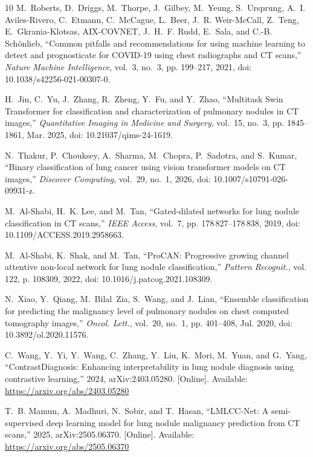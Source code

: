 \documentclass{ieeeaccess}
\begin{document}
\begin{thebibliography}{10}
M.~Roberts, D.~Driggs, M.~Thorpe, J.~Gilbey, M.~Yeung, S.~Ursprung, A.~I. Aviles-Rivero, C.~Etmann, C.~McCague, L.~Beer, J.~R. Weir-McCall, Z.~Teng, E.~Gkrania-Klotsas, {AIX-COVNET}, J.~H.~F. Rudd, E.~Sala, and C.-B. Sch{\"o}nlieb, ``Common pitfalls and recommendations for using machine learning to detect and prognosticate for {COVID}-19 using chest radiographs and {CT} scans,'' \emph{Nature Machine Intelligence}, vol.~3, no.~3, pp. 199--217, 2021, doi: 10.1038/s42256-021-00307-0.

H.~Jin, C.~Yu, J.~Zhang, R.~Zheng, Y.~Fu, and Y.~Zhao, ``Multitask {S}win {T}ransformer for classification and characterization of pulmonary nodules in {CT} images,'' \emph{Quantitative Imaging in Medicine and Surgery}, vol.~15, no.~3, pp. 1845--1861, Mar. 2025, doi: 10.21037/qims-24-1619.

N.~Thakur, P.~Chouksey, A.~Sharma, M.~Chopra, P.~Sadotra, and S.~Kumar, ``Binary classification of lung cancer using vision transformer models on {CT} images,'' \emph{Discover Computing}, vol.~29, no.~1, 2026, doi: 10.1007/s10791-026-09931-z.

M.~Al-Shabi, H.~K. Lee, and M.~Tan, ``Gated-dilated networks for lung nodule classification in {CT} scans,'' \emph{IEEE Access}, vol.~7, pp. 178\,827--178\,838, 2019, doi: 10.1109/ACCESS.2019.2958663.

M.~Al-Shabi, K.~Shak, and M.~Tan, ``{ProCAN}: Progressive growing channel attentive non-local network for lung nodule classification,'' \emph{Pattern Recognit.}, vol. 122, p. 108309, 2022, doi: 10.1016/j.patcog.2021.108309.

N.~Xiao, Y.~Qiang, M.~Bilal~Zia, S.~Wang, and J.~Lian, ``Ensemble classification for predicting the malignancy level of pulmonary nodules on chest computed tomography images,'' \emph{Oncol. Lett.}, vol.~20, no.~1, pp. 401--408, Jul. 2020, doi: 10.3892/ol.2020.11576.

\BIBentryALTinterwordspacing
C.~Wang, Y.~Yi, Y.~Wang, C.~Zhang, Y.~Liu, K.~Mori, M.~Yuan, and G.~Yang, ``{ContrastDiagnosis}: Enhancing interpretability in lung nodule diagnosis using contrastive learning,'' 2024, arXiv:2403.05280. [Online]. Available: \url{https://arxiv.org/abs/2403.05280}
\BIBentrySTDinterwordspacing

\BIBentryALTinterwordspacing
T.~B. Mamun, A.~Madhuri, N.~Sobir, and T.~Hasan, ``{LMLCC-Net}: A semi-supervised deep learning model for lung nodule malignancy prediction from {CT} scans,'' 2025, arXiv:2505.06370. [Online]. Available: \url{https://arxiv.org/abs/2505.06370}
\BIBentrySTDinterwordspacing


\end{thebibliography}
\end{document}
